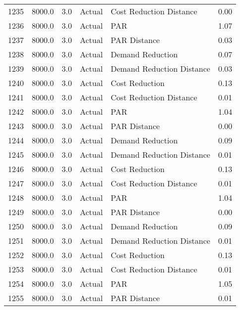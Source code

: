 \begin{longtable}{lrrllr}
1235 &       8000.0 &     3.0 &         Actual &    Cost Reduction Distance &   0.00 \\
1236 &       8000.0 &     3.0 &         Actual &                        PAR &   1.07 \\
1237 &       8000.0 &     3.0 &         Actual &               PAR Distance &   0.03 \\
1238 &       8000.0 &     3.0 &         Actual &           Demand Reduction &   0.07 \\
1239 &       8000.0 &     3.0 &         Actual &  Demand Reduction Distance &   0.03 \\
1240 &       8000.0 &     3.0 &         Actual &             Cost Reduction &   0.13 \\
1241 &       8000.0 &     3.0 &         Actual &    Cost Reduction Distance &   0.01 \\
1242 &       8000.0 &     3.0 &         Actual &                        PAR &   1.04 \\
1243 &       8000.0 &     3.0 &         Actual &               PAR Distance &   0.00 \\
1244 &       8000.0 &     3.0 &         Actual &           Demand Reduction &   0.09 \\
1245 &       8000.0 &     3.0 &         Actual &  Demand Reduction Distance &   0.01 \\
1246 &       8000.0 &     3.0 &         Actual &             Cost Reduction &   0.13 \\
1247 &       8000.0 &     3.0 &         Actual &    Cost Reduction Distance &   0.01 \\
1248 &       8000.0 &     3.0 &         Actual &                        PAR &   1.04 \\
1249 &       8000.0 &     3.0 &         Actual &               PAR Distance &   0.00 \\
1250 &       8000.0 &     3.0 &         Actual &           Demand Reduction &   0.09 \\
1251 &       8000.0 &     3.0 &         Actual &  Demand Reduction Distance &   0.01 \\
1252 &       8000.0 &     3.0 &         Actual &             Cost Reduction &   0.13 \\
1253 &       8000.0 &     3.0 &         Actual &    Cost Reduction Distance &   0.01 \\
1254 &       8000.0 &     3.0 &         Actual &                        PAR &   1.05 \\
1255 &       8000.0 &     3.0 &         Actual &               PAR Distance &   0.01 \\

\end{longtable}
